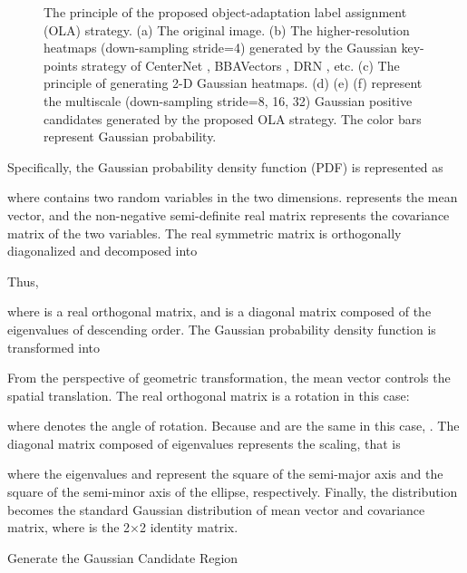 \begin{figure}[tbp]
	\vspace{-1em}
	\centering
	\vspace{-1em}
	\caption{The principle of the proposed object-adaptation label assignment (OLA) strategy. (a) The original image. (b) The higher-resolution heatmaps (down-sampling stride=4) generated by the Gaussian key-points strategy of CenterNet \cite{zhou2019objects}, BBAVectors \cite{yi2020oriented}, DRN \cite{pan2020dynamic}, etc. (c) The principle of generating 2-D Gaussian heatmaps. (d) (e) (f) represent the multiscale (down-sampling stride=8, 16, 32) Gaussian positive candidates generated by the proposed OLA strategy. The color bars represent Gaussian probability.}
	\label{fig:4}
	\vspace{-1em}
\end{figure}
Specifically, the Gaussian probability density function (PDF) is represented as

where   contains two random variables in the two dimensions.  represents the mean vector, and the non-negative semi-definite real matrix  represents the covariance matrix of the two variables. The real symmetric matrix  is orthogonally diagonalized and decomposed into

Thus,

where  is a real orthogonal matrix, and  is a diagonal matrix composed of the eigenvalues of descending order. The Gaussian probability density function is transformed into


From the perspective of geometric transformation, the mean vector  controls the spatial translation. The real orthogonal matrix  is a rotation in this case:

where  denotes the angle of rotation. Because  and  are the same in this case, . The diagonal matrix  composed of eigenvalues represents the scaling, that is

where the eigenvalues  and  represent the square of the semi-major axis  and the square of the semi-minor axis  of the ellipse, respectively. Finally, the distribution becomes the standard Gaussian distribution of  mean vector and  covariance matrix, where  is the 2×2 identity matrix. 

\begin{algorithm}[!t]
	\label{alg:1}
	\small \caption{Generate the Gaussian Candidate Region}\LinesNumbered {}
\end{algorithm}

